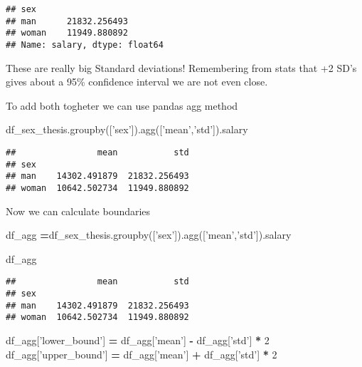 \documentclass[]{article}
\newenvironment{Shaded}{\begin{snugshade}}{\end{snugshade}}
\newcommand{\DecValTok}[1]{\textcolor[rgb]{0.00,0.00,0.81}{#1}}
\newcommand{\NormalTok}[1]{#1}
\newcommand{\OperatorTok}[1]{\textcolor[rgb]{0.81,0.36,0.00}{\textbf{#1}}}
\newcommand{\StringTok}[1]{\textcolor[rgb]{0.31,0.60,0.02}{#1}}
\begin{document}
\begin{verbatim}
## sex
## man      21832.256493
## woman    11949.880892
## Name: salary, dtype: float64
\end{verbatim}

These are really big Standard deviations! Remembering from stats that +2
SD's gives about a 95\% confidence interval we are not even close.

To add both togheter we can use pandas agg method

\begin{Shaded}
\begin{Highlighting}[]
\NormalTok{df_sex_thesis.groupby([}\StringTok{'sex'}\NormalTok{]).agg([}\StringTok{'mean'}\NormalTok{,}\StringTok{'std'}\NormalTok{]).salary}
\end{Highlighting}
\end{Shaded}

\begin{verbatim}
##                mean           std
## sex                              
## man    14302.491879  21832.256493
## woman  10642.502734  11949.880892
\end{verbatim}

Now we can calculate boundaries

\begin{Shaded}
\begin{Highlighting}[]
\NormalTok{df_agg }\OperatorTok{=}\NormalTok{df_sex_thesis.groupby([}\StringTok{'sex'}\NormalTok{]).agg([}\StringTok{'mean'}\NormalTok{,}\StringTok{'std'}\NormalTok{]).salary}
\end{Highlighting}
\end{Shaded}

\begin{Shaded}
\begin{Highlighting}[]
\NormalTok{df_agg}
\end{Highlighting}
\end{Shaded}

\begin{verbatim}
##                mean           std
## sex                              
## man    14302.491879  21832.256493
## woman  10642.502734  11949.880892
\end{verbatim}

\begin{Shaded}
\begin{Highlighting}[]
\NormalTok{df_agg[}\StringTok{'lower_bound'}\NormalTok{] }\OperatorTok{=}\NormalTok{ df_agg[}\StringTok{'mean'}\NormalTok{] }\OperatorTok{-}\NormalTok{ df_agg[}\StringTok{'std'}\NormalTok{] }\OperatorTok{*} \DecValTok{2}
\NormalTok{df_agg[}\StringTok{'upper_bound'}\NormalTok{] }\OperatorTok{=}\NormalTok{ df_agg[}\StringTok{'mean'}\NormalTok{] }\OperatorTok{+}\NormalTok{ df_agg[}\StringTok{'std'}\NormalTok{] }\OperatorTok{*} \DecValTok{2}
\end{Highlighting}
\end{Shaded}
\end{document}
